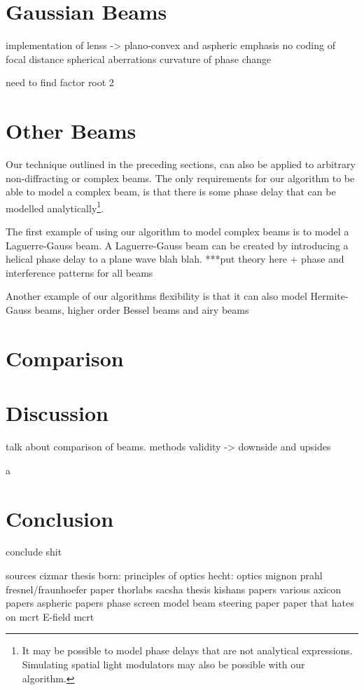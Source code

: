 \section{Gaussian Beams}

implementation of lenss -> plano-convex and aspheric
emphasis no coding of focal distance
spherical aberrations 
curvature of phase change

need to find factor root 2

\section{Other Beams}

Our technique outlined in the preceding sections, can also be applied to arbitrary non-diffracting or complex beams. The only requirements for our algorithm to be able to model a complex beam, is that there is some phase delay that can be modelled analytically\footnote{It may be possible to model phase delays that are not analytical expressions. Simulating spatial light modulators may also be possible with our algorithm.}.

The first example of using our algorithm to model complex beams is to model a Laguerre-Gauss beam. A Laguerre-Gauss beam can be created by introducing a helical phase delay to a plane wave blah blah. ***put theory here + phase and interference patterns for all beams

Another example of our algorithms flexibility is that it can also model Hermite-Gauss beams, higher order Bessel beams and airy beams

\section{Comparison}

\section{Discussion}

talk about comparison of beams. methods validity -> downside and upsides

a~\cite{mignon2016fractional}
\section{Conclusion}

conclude shit


sources
cizmar thesis
born: principles of optics
hecht: optics
mignon
prahl
fresnel/fraunhoefer paper
thorlabs
sacsha thesis
kishans papers
various axicon papers
aspheric papers
phase screen model
beam steering paper
paper that hates on mcrt
E-field mcrt